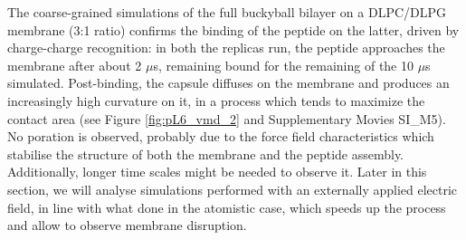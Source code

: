 The coarse-grained simulations of the full buckyball bilayer on a DLPC/DLPG membrane (3:1 ratio) confirms the binding of the peptide on the latter, driven by charge-charge recognition: in both the replicas run, the peptide approaches the membrane after about 2 $\mu$s, remaining bound for the remaining of the 10 $\mu$s simulated.
%
Post-binding, the capsule diffuses on the membrane and produces an increasingly high curvature on it, in a process which tends to maximize the contact area (see Figure \ref{fig:pL6_vmd_2} and Supplementary Movies SI\_M5). No poration is observed, probably due to the force field characteristics which stabilise the structure of both the membrane and the peptide assembly. Additionally, longer time scales might be needed to observe it. Later in this section, we will analyse simulations performed with an externally applied electric field, in line with what done in the atomistic case, which speeds up the process and allow to observe membrane disruption.

